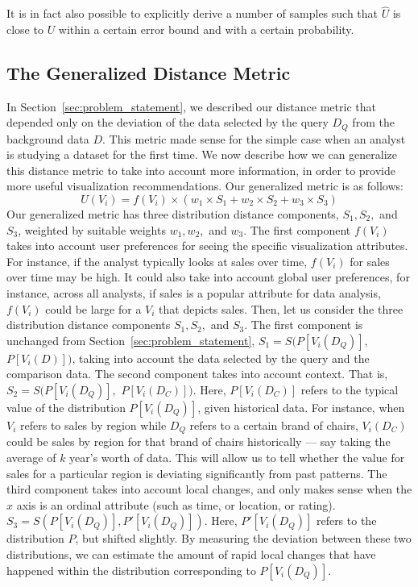 It is in fact also possible to explicitly derive a number of samples 
such that $\hat{U}$ is close to $U$ within a certain error bound
and with a certain probability. 




\subsection{The Generalized Distance Metric}\label{sec:general-metric}

In Section~\ref{sec:problem_statement}, we described our
distance metric that depended only on the deviation of the data selected
by the query $D_Q$ from the background data $D$.
This metric made sense for the simple case
when an analyst is studying a dataset for the first time.
We now describe how we can generalize this distance
metric to take into account more information,
in order to provide more useful visualization recommendations.
Our generalized metric is as follows:
$$ U (V_i) = f(V_i) \times (w_1\times S_1 + w_2 \times S_2 + w_3 \times S_3)$$
Our generalized metric has three distribution
distance components, $S_1, S_2,$ and $S_3$,
weighted by suitable weights $w_1, w_2,$ and $w_3$.
The first component $f(V_i)$ takes into
account user preferences for seeing the specific 
visualization attributes.
For instance, if the analyst typically looks at
sales over time, $f(V_i)$ for sales over time
may be high.
It could also take into account global user preferences,
for instance, across all analysts, if sales is a popular
attribute for data analysis, $f(V_i)$ could be large for
a $V_i$ that depicts sales.
Then, let us consider the three distribution distance
components $S_1, S_2,$ and $S_3$.
The first component is unchanged from Section~\ref{sec:problem_statement},
$S_1 = S ( P[V_i (D_Q)],$ $P[V_i (D)] )$,
taking into account the data selected by the query and
the comparison data.
The second component takes into account context.
That is, $S_2 = S ( P[V_i (D_Q)], $ $P[V_i (D_C)] )$.
Here, $P[V_i (D_C)]$ refers to the typical value of the distribution 
$P[V_i (D_Q)]$,
given historical data.
For instance, when $V_i$ refers to sales by
region while $D_Q$ refers to a certain brand of chairs,
$V_i(D_C)$ could be sales by region for that brand of chairs
historically --- say taking the average of $k$ year's worth of data.
This will allow us to tell whether the value for sales for a particular
region is deviating significantly from past patterns.
The third component takes into account local changes,
and only makes sense when the $x$ axis is an ordinal attribute
(such as time, or location, or rating).
$S_3 = S ( P[V_i (D_Q)], P'[V_i (D_Q)] )$.
Here, $P'[V_i (D_Q)]$ refers to the distribution $P$, but shifted slightly.
By measuring the deviation between these two distributions,
we can estimate the amount of rapid local changes that have happened
within the distribution corresponding to $P[V_i (D_Q)]$.


